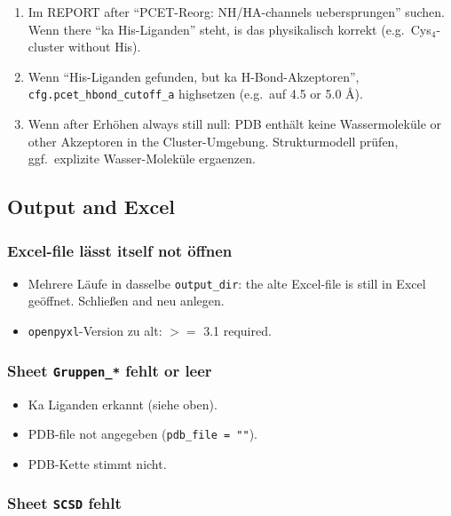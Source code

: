 \documentclass[11pt,a4paper,twoside]{article}
\theoremstyle{remark}
\begin{document}
\begin{enumerate}
  \item Im REPORT after ``PCET-Reorg: NH/HA-channels uebersprungen''
        suchen. Wenn there ``ka His-Liganden'' steht, is das
        physikalisch korrekt (e.g.\ Cys$_4$-cluster without His).
  \item Wenn ``His-Liganden gefunden, but ka H-Bond-Akzeptoren'',
        \texttt{cfg.pcet\_hbond\_cutoff\_a} highsetzen (e.g.\ auf
        4.5 or 5.0 \AA{}).
  \item Wenn after Erh\"ohen always still null: PDB enth\"alt keine
        Wassermolek\"ule or other Akzeptoren in the Cluster-Umgebung.
        Strukturmodell pr\"ufen, ggf.\ explizite Wasser-Molek\"ule
        ergaenzen.
\end{enumerate}

\subsection{Output and Excel}

\subsubsection*{Excel-file l\"asst itself not \"offnen}

\begin{itemize}
  \item Mehrere L\"aufe in dasselbe \texttt{output\_dir}: the alte
        Excel-file is still in Excel ge\"offnet. Schlie\ss en and neu
        anlegen.
  \item \texttt{openpyxl}-Version zu alt: $>=$ 3.1 required.
\end{itemize}

\subsubsection*{Sheet \texttt{Gruppen\_*} fehlt or leer}

\begin{itemize}
  \item Ka Liganden erkannt (siehe oben).
  \item PDB-file not angegeben (\texttt{pdb\_file = ""}).
  \item PDB-Kette stimmt nicht.
\end{itemize}

\subsubsection*{Sheet \texttt{SCSD} fehlt}
\end{document}
